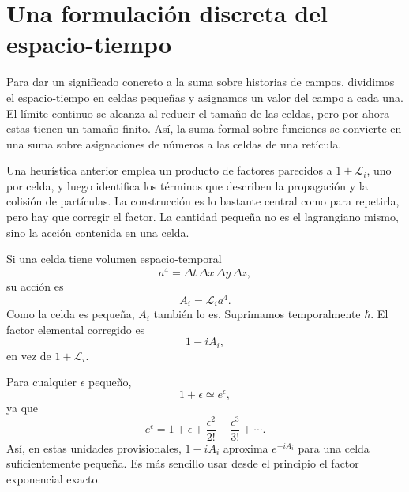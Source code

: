\section{Una formulación discreta del espacio-tiempo}

Para dar un significado concreto a la suma sobre historias de campos, dividimos el espacio-tiempo en celdas pequeñas y asignamos un valor del campo a cada una. El límite continuo se alcanza al reducir el tamaño de las celdas, pero por ahora estas tienen un tamaño finito. Así, la suma formal sobre funciones se convierte en una suma sobre asignaciones de números a las celdas de una retícula.

Una heurística anterior emplea un producto de factores parecidos a \(1+\mathcal{L}_i\), uno por celda, y luego identifica los términos que describen la propagación y la colisión de partículas. La construcción es lo bastante central como para repetirla, pero hay que corregir el factor. La cantidad pequeña no es el lagrangiano mismo, sino la acción contenida en una celda.

Si una celda tiene volumen espacio-temporal
\begin{equation}
a^4=\Delta t\,\Delta x\,\Delta y\,\Delta z,
\end{equation}
su acción es
\begin{equation}
A_i=\mathcal{L}_i a^4.
\end{equation}
Como la celda es pequeña, \(A_i\) también lo es. Suprimamos temporalmente \(\hbar\). El factor elemental corregido es
\begin{equation}
1-iA_i,
\end{equation}
en vez de \(1+\mathcal{L}_i\).

Para cualquier \(\epsilon\) pequeño,
\begin{equation}
1+\epsilon\simeq e^\epsilon,
\end{equation}
ya que
\begin{equation}
e^\epsilon
=1+\epsilon+\frac{\epsilon^2}{2!}
+\frac{\epsilon^3}{3!}+\cdots.
\end{equation}
Así, en estas unidades provisionales, \(1-iA_i\) aproxima \(e^{-iA_i}\) para una celda suficientemente pequeña. Es más sencillo usar desde el principio el factor exponencial exacto.

\begin{classroomqa}
\end{classroomqa}

